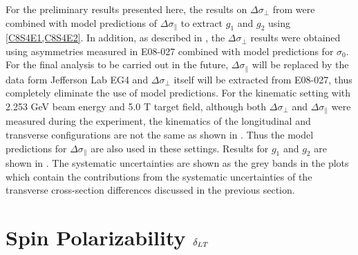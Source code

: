 For the preliminary results presented here, the results on $\Delta\sigma_\perp$ from  were combined with model predictions of $\Delta\sigma_\parallel$ to extract $g_1$ and $g_2$ using \cref{C8S4E1,C8S4E2}. In addition, as described in , the $\Delta\sigma_\perp$ results were obtained using asymmetries measured in E08-027 combined with model predictions for $\sigma_0$. For the final analysis to be carried out in the future, $\Delta\sigma_\parallel$ will be replaced by the data form Jefferson Lab EG4 and $\Delta\sigma_\perp$ itself will be extracted from E08-027, thus completely eliminate the use of model predictions. For the kinematic setting with 2.253 GeV beam energy and 5.0 T target field, although both $\Delta\sigma_\perp$ and $\Delta\sigma_\parallel$ were measured during the experiment, the kinematics of the longitudinal and transverse configurations are not the same as shown in . Thus the model predictions for $\Delta\sigma_\parallel$ are also used in these settings. Results for $g_1$ and $g_2$ are shown in . The systematic uncertainties are shown as the grey bands in the plots which contain the contributions from the systematic uncertainties of the transverse cross-section differences discussed in the previous section.

\section{\texorpdfstring{Spin Polarizability $\delta_{LT}$}{Spin Polarizability delta\_\{LT\}}}
\label{C8S5}

